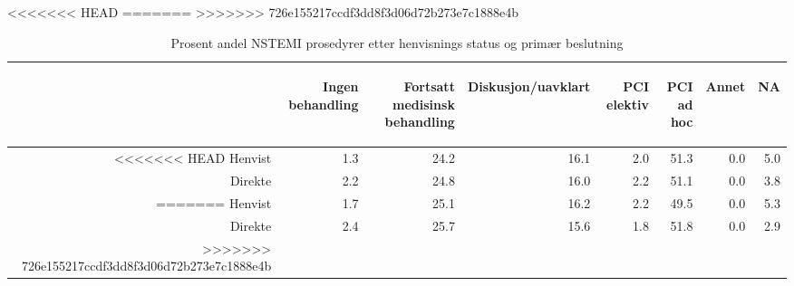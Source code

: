 \documentclass[presentation,xcolor=pdftex,dvipsnames,table]{beamer}
\begin{document}
\begin{frame}
\begin{tiny}
<<<<<<< HEAD
=======
>>>>>>> 726e155217ccdf3dd8f3d06d72b273e7c1888e4b
\begin{table}[ht]
\centering
\begin{tabular}{rrrrrrrr}
  \toprule
 & \begin{sideways} Ingen behandling \end{sideways} & \begin{sideways} Fortsatt medisinsk behandling \end{sideways} & \begin{sideways} Diskusjon/uavklart \end{sideways} & \begin{sideways} PCI elektiv \end{sideways} & \begin{sideways} PCI ad hoc \end{sideways} & \begin{sideways} Annet \end{sideways} & \begin{sideways} NA \end{sideways} \\ 
  \midrule
<<<<<<< HEAD
Henvist & 1.3 & 24.2 & 16.1 & 2.0 & 51.3 & 0.0 & 5.0 \\ 
  Direkte & 2.2 & 24.8 & 16.0 & 2.2 & 51.1 & 0.0 & 3.8 \\ 
=======
Henvist & 1.7 & 25.1 & 16.2 & 2.2 & 49.5 & 0.0 & 5.3 \\ 
  Direkte & 2.4 & 25.7 & 15.6 & 1.8 & 51.8 & 0.0 & 2.9 \\ 
>>>>>>> 726e155217ccdf3dd8f3d06d72b273e7c1888e4b
   \bottomrule
\end{tabular}
\caption{Prosent andel NSTEMI prosedyrer etter henvisnings status og primær beslutning} 
\end{table}\end{tiny}
\end{frame}
\end{document}
